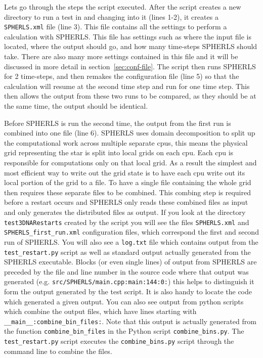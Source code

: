 \documentclass[12pt,a4paper]{book}
\begin{document}
Lets go through the steps the script executed. After the script creates a new directory to run a test in and changing into it (lines 1-2), it creates a {\tt SPHERLS.xml} file (line 3). This file contains all the settings to perform a calculation with SPHERLS. This file has settings such as where the input file is located, where the output should go, and how many time-steps SPHERLS should take. There are also many more settings contained in this file and it will be discussed in more detail in section~\ref{sec:conf-file}. The script then runs SPHERLS for 2 time-steps, and then remakes the configuration file (line 5) so that the calculation will resume at the second time step and run for one time step. This then allows the output from these two runs to be compared, as they should be at the same time, the output should be identical. 

Before SPHERLS is run the second time, the output from the first run is combined into one file (line 6). SPHERLS uses domain decomposition to split up the computational work across multiple separate cpus, this means the physical grid representing the star is split into local grids on each cpu. Each cpu is responsible for computations only on that local grid. As a result the simplest and most efficient way to write out the grid state is to have each cpu write out its local portion of the grid to a file. To have a single file containing the whole grid then requires these separate files to be combined. This combing step is required before a restart occurs and SPHERLS only reads these combined files as input and only generates the distributed files as output. If you look at the directory {\tt test3DNARestarts} created by the script you will see the files {\tt SPHERLS.xml} and {\tt SPHERLS\_first\_run.xml} configuration files, which correspond the first and second run of SPHERLS. You will also see a {\tt log.txt} file which contains output from the {\tt test\_restart.py} script as well as standard output actually generated from the SPHERLS executable. Blocks (or even single lines) of output from SPHERLS are preceded by the file and line number in the source code where that output was generated (e.g. {\tt src/SPHERLS/main.cpp:main:144:0:}) this helps to distinguish it form the output generated by the test script. It is also handy to locate the code which generated a given output. You can also see output from python scripts which combine the output files, which have lines starting with {\tt \_\_main\_\_:combine\_bin\_files:}. Note that this output is actually generated from the function {\tt combine\_bin\_files} in the Python script {\tt combine\_bins.py}. The {\tt test\_restart.py} script executes the {\tt combine\_bins.py} script through the command line to combine the files. 
\end{document}

